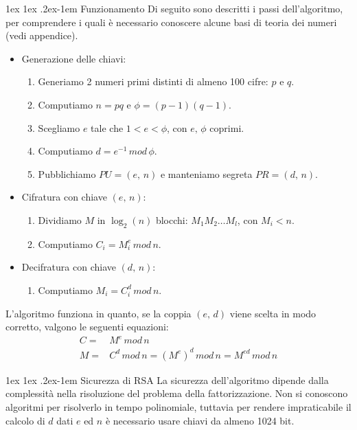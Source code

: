 \documentclass[a4paper, 11pt, notitlepage, fleqn]{report}
\makeatletter
\renewcommand{\paragraph}{%
	\@startsection{paragraph}{4}%
	{\z@}{1ex \@plus 1ex \@minus .2ex}{-1em}%
	{\normalfont\normalsize\bfseries}%
}
\makeatother
\begin{document}
\paragraph{Funzionamento}
Di seguito sono descritti i passi dell'algoritmo, per comprendere i quali è necessario conoscere alcune basi di teoria dei numeri (vedi appendice).
\begin{itemize}
	\item Generazione delle chiavi:
	\begin{enumerate}
		\item Generiamo 2 numeri primi distinti di almeno 100 cifre: $p$ e $q$.
		\item Computiamo $n=pq$ e $\phi=(p-1)(q-1)$.
		\item Scegliamo $e$ tale che $1<e<\phi$, con $e,\,\phi$ coprimi.
		\item Computiamo $d=e^{-1}\,mod\,\phi$.
		\item Pubblichiamo $PU = (e,\,n)$ e manteniamo segreta $PR = (d,\,n)$.
	\end{enumerate}
	\item Cifratura con chiave $(e,\,n)$:
	\begin{enumerate}
		\item Dividiamo $M$ in $\log_2(n)$ blocchi: $M_1M_2\dots M_l$, con $M_i < n$.
		\item Computiamo $C_i = M_i^e\,mod\,n$.
	\end{enumerate}
	\item Decifratura con chiave $(d,\,n)$:
	\begin{enumerate}
		\item Computiamo $M_i = C_i^d\,mod\,n$.
	\end{enumerate}
\end{itemize}
L'algoritmo funziona in quanto, se la coppia $(e,\,d)$ viene scelta in modo corretto, valgono le seguenti equazioni:
\begin{align*}
	C =& M^e\,mod\,n\\
	M =& C^d\,mod\,n = (M^e)^d\,mod\,n = M^{ed}\,mod\,n
\end{align*}

\paragraph{Sicurezza di RSA}
La sicurezza dell'algoritmo dipende dalla complessità nella risoluzione del problema della fattorizzazione. Non si conoscono algoritmi per risolverlo in tempo polinomiale, tuttavia per rendere impraticabile il calcolo di $d$ dati $e$ ed $n$ è necessario usare chiavi da almeno 1024 bit.
\end{document}

